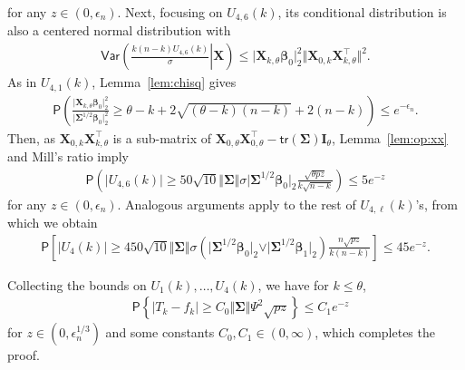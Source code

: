 \documentclass[11pt, a4paper]{article}
\newcommand{\mbf}{\mathbf}
\newcommand{\eps}{\epsilon}
\renewcommand{\l}{\left}
\renewcommand{\r}{\right}
\newcommand{\cp}{\theta}
\newcommand{\Var}[0]{\mathsf{Var}}
\newcommand{\tr}[0]{\mathsf{tr}}
\newcommand{\p}{\mathsf{P}}
\theoremstyle{definition}
\theoremstyle{definition}
\theoremstyle{definition}
\theoremstyle{definition}
\theoremstyle{definition}
\theoremstyle{remark}
\theoremstyle{definition}
\theoremstyle{definition}
\theoremstyle{definition}
\begin{document}
for any $z \in (0, \eps_n)$.
Next, focusing on $U_{4, 6}(k)$, its conditional distribution is also a centered normal distribution with
\begin{align*}
\Var\l( \l. \frac{k(n - k) U_{4, 6}(k)}{\sigma} \r\vert \mbf X \r) \le 
\vert \mbf X_{k, \cp} \bm\beta_0 \vert_2^2 \Vert \mbf X_{0, k}\mbf X_{k, \cp}^\top \Vert^2.
\end{align*}
As in $U_{4, 1}(k)$, Lemma~\ref{lem:chisq} gives
\begin{align*}
\p\l( \frac{\vert \mbf X_{k, \cp} \bm\beta_0 \vert_2^2}{\vert \bm\Sigma^{1/2} \bm\beta_0 \vert_2^2} \ge \cp - k + 2\sqrt{(\cp - k)(n-k)} + 2 (n - k) \r) \le e^{-\eps_n}.
\end{align*}
Then, as $\mbf X_{0, k}\mbf X_{k, \cp}^\top$ is a sub-matrix of $\mbf X_{0, \cp}\mbf X_{0, \cp}^\top - \tr(\bm\Sigma) \mbf I_\cp$, Lemma~\ref{lem:op:xx} and Mill's ratio imply 
\begin{align*}
\p\l( \vert U_{4, 6}(k) \vert \ge 
50\sqrt{10} \Vert \bm\Sigma \Vert \sigma \vert \bm\Sigma^{1/2} \bm\beta_0 \vert_2 \frac{\sqrt{\cp pz}}{k\sqrt{n - k}} \r) \le 5 e^{-z}
\end{align*}
for any $z \in (0, \eps_n)$.
Analogous arguments apply to the rest of $U_{4, \ell}(k)$'s, from which we obtain
\begin{align*}
\p\l[ \vert U_4(k) \vert \ge 450 \sqrt{10} \Vert \bm\Sigma \Vert \sigma (\vert \bm\Sigma^{1/2} \bm\beta_0 \vert_2 \vee \vert \bm\Sigma^{1/2} \bm\beta_1 \vert_2) \frac{n\sqrt{pz}}{k(n - k)} \r] \le 45e^{-z}.
\end{align*}

Collecting the bounds on $U_1(k), \ldots, U_4(k)$, we have for $k \le\cp$,
\begin{align*}
& \p\l\{ \l\vert T_k - f_k \r\vert \ge C_0 \Vert \bm\Sigma \Vert \Psi^2 \sqrt{pz} \r\} \le C_1 e^{-z}
\end{align*}
for $z \in (0, \eps_n^{1/3})$ and some constants $C_0, C_1 \in (0, \infty)$, which completes the proof.
\end{document}
